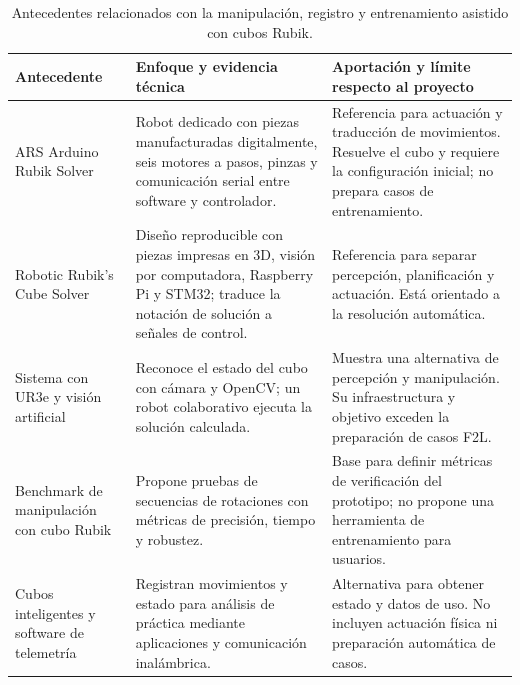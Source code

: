 \begin{table}[H]
\centering
\small
\renewcommand{\arraystretch}{1.2}
\begin{tabularx}{\textwidth}{|p{3.1cm}|X|X|}
\hline
\textbf{Antecedente} & \textbf{Enfoque y evidencia técnica} & \textbf{Aportación y límite respecto al proyecto} \\ \hline

ARS Arduino Rubik Solver \cite{Milanesio2019} & Robot dedicado con piezas manufacturadas digitalmente, seis motores a pasos, pinzas y comunicación serial entre software y controlador. & Referencia para actuación y traducción de movimientos. Resuelve el cubo y requiere la configuración inicial; no prepara casos de entrenamiento. \\ \hline

Robotic Rubik's Cube Solver \cite{Novakova2018} & Diseño reproducible con piezas impresas en 3D, visión por computadora, Raspberry Pi y STM32; traduce la notación de solución a señales de control. & Referencia para separar percepción, planificación y actuación. Está orientado a la resolución automática. \\ \hline

Sistema con UR3e y visión artificial \cite{Gorriz2023} & Reconoce el estado del cubo con cámara y OpenCV; un robot colaborativo ejecuta la solución calculada. & Muestra una alternativa de percepción y manipulación. Su infraestructura y objetivo exceden la preparación de casos F2L. \\ \hline

Benchmark de manipulación con cubo Rubik \cite{Yang2020} & Propone pruebas de secuencias de rotaciones con métricas de precisión, tiempo y robustez. & Base para definir métricas de verificación del prototipo; no propone una herramienta de entrenamiento para usuarios. \\ \hline

Cubos inteligentes y software de telemetría \cite{GanCube2026,GanWebBluetooth2026} & Registran movimientos y estado para análisis de práctica mediante aplicaciones y comunicación inalámbrica. & Alternativa para obtener estado y datos de uso. No incluyen actuación física ni preparación automática de casos. \\ \hline
\end{tabularx}
\caption{Antecedentes relacionados con la manipulación, registro y entrenamiento asistido con cubos Rubik.}
\label{tab:antecedentes-rubik}
\end{table}

\clearpage
